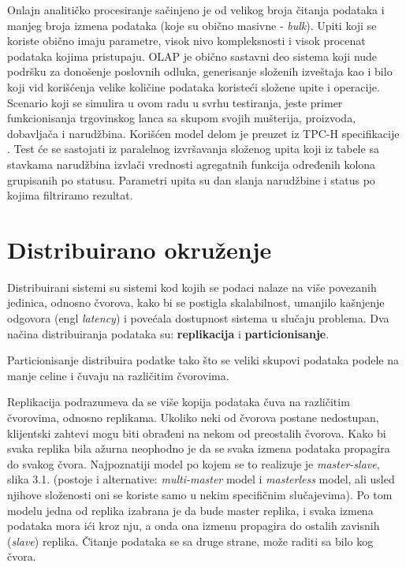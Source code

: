 \documentclass[12pt,oneside]{memoir}
\begin{document}
Onlajn analitičko procesiranje sačinjeno je od velikog broja čitanja podataka i manjeg broja izmena podataka (koje su obično masivne - \textit{bulk}). Upiti koji se koriste obično imaju parametre, visok nivo kompleksnosti i visok procenat podataka kojima pristupaju. OLAP je obično sastavni deo sistema koji nude podršku za donošenje poslovnih odluka, generisanje složenih izveštaja kao i bilo koji vid korišćenja velike količine podataka koristeći složene upite i operacije. Scenario koji se simulira u ovom radu u svrhu testiranja, jeste primer funkcionisanja trgovinskog lanca sa skupom svojih mušterija, proizvoda, dobavljača i narudžbina. Korišćen model delom je preuzet iz TPC-H specifikacije \cite{tpch}. Test će se sastojati iz paralelnog izvršavanja složenog upita koji iz tabele sa stavkama narudžbina izvlači vrednosti agregatnih funkcija određenih kolona grupisanih po statusu. Parametri upita su dan slanja narudžbine i status po kojima filtriramo rezultat.


\section{Distribuirano okruženje}

Distribuirani sistemi su sistemi kod kojih se podaci nalaze na više povezanih jedinica, odnosno čvorova, kako bi se postigla skalabilnost, umanjilo kašnjenje odgovora (engl \textit{latency}) i povećala dostupnost sistema u slučaju problema.  Dva načina distribuiranja podataka su: \textbf{replikacija} i \textbf{particionisanje}. 


Particionisanje distribuira podatke tako što se veliki skupovi podataka podele na manje celine i čuvaju na različitim čvorovima. 

Replikacija podrazumeva da se više kopija podataka čuva na različitim čvorovima, odnosno replikama. Ukoliko neki od čvorova postane nedostupan, klijentski zahtevi mogu biti obrađeni na nekom od preostalih čvorova. Kako bi svaka replika bila ažurna neophodno je da se svaka izmena podataka propagira do svakog čvora. Najpoznatiji model po kojem se to realizuje je \textit{master-slave}, slika 3.1. (postoje i alternative: \textit{multi-master} model i \textit{masterless} model, ali usled njihove složenosti oni se koriste samo u nekim specifičnim slučajevima). Po tom modelu jedna od replika izabrana je da bude master replika, i svaka izmena podataka mora ići kroz nju, a onda ona izmenu propagira do ostalih zavisnih (\textit{slave}) replika. Čitanje podataka se sa druge strane, može raditi sa bilo kog čvora. 
\end{document}
